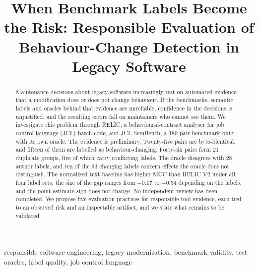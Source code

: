 \documentclass[conference]{IEEEtran}
\begin{document}
\title{When Benchmark Labels Become the Risk: Responsible Evaluation of Behaviour-Change Detection in Legacy Software}

\author{
\and
{}
\and
{}
\and
{}
}

\maketitle

\begin{abstract}
Maintenance decisions about legacy software increasingly rest on automated evidence that a modification does or does not change behaviour. If the benchmarks, semantic labels and oracles behind that evidence are unreliable, confidence in the decisions is unjustified, and the resulting errors fall on maintainers who cannot see them. We investigate this problem through RELIC, a behavioural-contract analyser for job control language (JCL) batch code, and JCL-SemBench, a 180-pair benchmark built with its own oracle. The evidence is preliminary. Twenty-five pairs are byte-identical, and fifteen of them are labelled as behaviour-changing. Forty-six pairs form 21 duplicate groups, five of which carry conflicting labels. The oracle disagrees with 28 author labels, and ten of the 93 changing labels concern effects the oracle does not distinguish. The normalized text baseline has higher MCC than RELIC V2 under all four label sets; the size of the gap ranges from $-0.17$ to $-0.34$ depending on the labels, and the point-estimate sign does not change. No independent review has been completed. We propose five evaluation practices for responsible tool evidence, each tied to an observed risk and an inspectable artifact, and we state what remains to be validated.
\end{abstract}

\begin{IEEEkeywords}
responsible software engineering, legacy modernisation, benchmark validity, test oracles, label quality, job control language
\end{IEEEkeywords}
\end{document}
